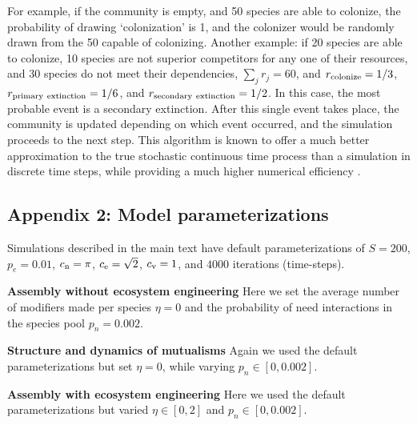 \documentclass[twocolumn,preprintnumbers,amsmath,amssymb,superscriptaddress,linenumbers]{revtex4-1}
\newcommand{\rr}[1]{{\rm #1}}
\begin{document}
For example, if the community is empty, and 50 species are able to colonize, the probability of drawing `colonization' is 1, and the colonizer would be randomly drawn from the 50 capable of colonizing.
Another example: if 20 species are able to colonize, 10 species are not superior competitors for any one of their resources, and 30 species do not meet their dependencies, $\sum_j{r_j} = 60$, and $r_\rr{colonize} = 1/3$, $r_\rr{primary~extinction} = 1/6$, and $r_\rr{secondary~extinction} = 1/2$.
In this case, the most probable event is a secondary extinction.
After this single event takes place, the community is updated depending on which event occurred, and the simulation proceeds to the next step.
This algorithm is known to offer a much better approximation to the true stochastic continuous time process than a simulation in discrete time steps, while providing a much higher numerical efficiency \cite{Gillespie1977}.


\subsection*{Appendix 2: Model parameterizations}
Simulations described in the main text have default parameterizations of $S=200$, $p_e=0.01$, $c_{\rm n} = \pi$, $c_{\rm e} = \sqrt{2}$, $c_{\rm v} = 1$, and $4000$ iterations (time-steps).

\noindent \textbf{Assembly without ecosystem engineering} Here we set the average number of modifiers made per species $\eta = 0$ and the probability of need interactions in the species pool $p_n=0.002$.

\noindent \textbf{Structure and dynamics of mutualisms} Again we used the default parameterizations but set $\eta = 0$, while varying $p_n \in [0,0.002]$.

\noindent \textbf{Assembly with ecosystem engineering} Here we used the default parameterizations but varied $\eta \in [0,2]$ and $p_n \in [0,0.002]$.
\end{document}
